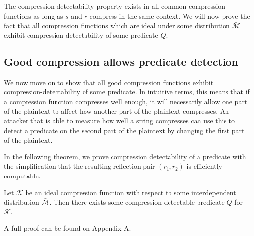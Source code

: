 The compression-detectability property exists in all common compression
functions as long as $s$ and $r$ compress in the same context. We will now
prove the fact that all compression functions which are ideal under some
distribution $\bar{\mathcal{M}}$ exhibit compression-detectability of some
predicate $Q$.

\subsection{Good compression allows predicate detection}

We now move on to show that all good compression functions exhibit
compression-detectability of some predicate. In intuitive terms, this means
that if a compression function compresses well enough, it will necessarily
allow one part of the plaintext to affect how another part of the plaintext
compresses. An attacker that is able to measure how well a string compresses
can use this to detect a predicate on the second part of the plaintext by
changing the first part of the plaintext.

In the following theorem, we prove compression detectability of a predicate with
the simplification that the resulting reflection pair $(r_1, r_2)$ is
efficiently computable.


\begin{lemma}
Let $\mathcal{K}$ be an ideal compression function with respect to some
interdependent distribution $\bar{\mathcal{M}}$. Then there exists
some compression-detectable predicate $Q$ for $\mathcal{K}$.
\end{lemma}

A full proof can be found on Appendix A.

